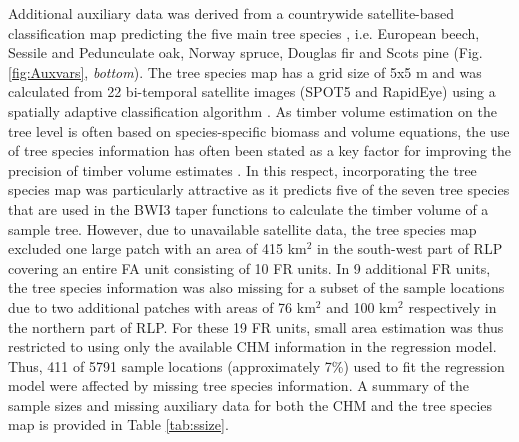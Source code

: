 Additional auxiliary data was derived from a countrywide satellite-based classification map predicting the five main tree species \citep{stoffels2015}, i.e. European beech, Sessile and Pedunculate oak, Norway spruce, Douglas fir and Scots pine (Fig. \ref{fig:Auxvars}, \textit{bottom}). The tree species map has a grid size of 5x5 m and was calculated from 22 bi-temporal satellite images (SPOT5 and RapidEye) using a spatially adaptive classification algorithm \citep{stoffels2012}. As timber volume estimation on the tree level is often based on species-specific biomass and volume equations, the use of tree species information has often been stated as a key factor for improving the precision of timber volume estimates \citep{white2016}. In this respect, incorporating the tree species map was particularly attractive as it predicts five of the seven tree species that are used in the BWI3 taper functions \citep{kublin2013} to calculate the timber volume of a sample tree. However, due to unavailable satellite data, the tree species map excluded one large patch with an area of 415 km$^2$ in the south-west part of RLP covering an entire FA unit consisting of 10 FR units. In 9 additional FR units, the tree species information was also missing for a subset of the sample locations due to two additional patches with areas of 76 km$^2$ and 100 km$^2$ respectively in the northern part of RLP. For these 19 FR units, small area estimation was thus restricted to using only the available CHM information in the regression model. Thus, 411 of 5791 sample locations (approximately 7\%) used to fit the regression model were affected by missing tree species information. A summary of the sample sizes and missing auxiliary data for both the CHM and the tree species map is provided in Table \ref{tab:ssize}.

